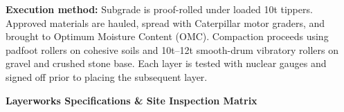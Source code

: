 \noindent
\begin{minipage}[t]{0.185\textwidth}\end{minipage}\hfill
\begin{minipage}[t]{0.185\textwidth}\end{minipage}\hfill
\begin{minipage}[t]{0.185\textwidth}\end{minipage}\hfill
\begin{minipage}[t]{0.185\textwidth}\end{minipage}\hfill
\begin{minipage}[t]{0.185\textwidth}\end{minipage}

\vspace{0.20cm}

\noindent
\begin{tcolorbox}[enhanced, colback=mhoffwhite, colframe=mhlightgray, boxrule=0.7pt, arc=4pt, left=9pt, right=9pt, top=7pt, bottom=7pt, borderline west={3pt}{0pt}{mhgold}, drop shadow=black!4]
    {\fontsize{8.1pt}{11.0pt}\selectfont\color{mhtext}
    \textbf{Execution method:} Subgrade is proof-rolled under loaded 10t tippers. Approved materials are hauled, spread with Caterpillar motor graders, and brought to Optimum Moisture Content (OMC). Compaction proceeds using padfoot rollers on cohesive soils and 10t--12t smooth-drum vibratory rollers on gravel and crushed stone base. Each layer is tested with nuclear gauges and signed off prior to placing the subsequent layer.
    }
\end{tcolorbox}

\vfill

\noindent
{\large\bfseries\color{mhnavy} Layerworks Specifications \& Site Inspection Matrix}
\vspace{0.10cm}

